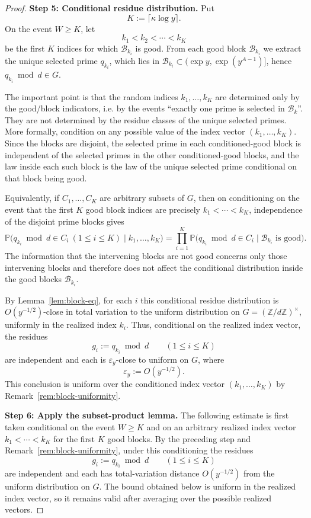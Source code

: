 \documentclass[11pt,reqno]{amsart}
\theoremstyle{plain}
\theoremstyle{definition}
\newcommand{\ZZ}{\mathbb{Z}}
\newcommand{\PP}{\mathbb{P}}
\newcommand{\eps}{\varepsilon}
\begin{document}
\begin{proof}
\medskip\noindent
\textbf{Step 5: Conditional residue distribution.} Put
\[
K:=\lceil \kappa\log y\rceil.
\]
On the event $W\ge K$, let
\[
k_1<k_2<\cdots<k_K
\]
be the first $K$ indices for which $\mathcal B_{k_i}$ is good. From each good
block $\mathcal B_{k_i}$ we extract the unique selected prime $q_{k_i}$, which
lies in $\mathcal B_{k_i}\subset(\exp y,\exp(y^{A-1})]$, hence
$q_{k_i}\bmod d\in G$.

The important point is that the random indices $k_1,\dots,k_K$ are determined
only by the good/block indicators, i.e. by the events ``exactly one prime is
selected in $\mathcal B_k$''. They are not determined by the residue classes of
the unique selected primes. More formally, condition on any possible value of
the index vector $(k_1,\dots,k_K)$. Since the blocks are disjoint, the selected
prime in each conditioned-good block is independent of the selected primes in
the other conditioned-good blocks, and the law inside each such block is the
law of the unique selected prime conditional on that block being good.

Equivalently, if $C_1,\ldots,C_K$ are arbitrary subsets of $G$, then on
conditioning on the event that the first $K$ good block indices are precisely
$k_1<\cdots<k_K$, independence of the disjoint prime blocks gives
\[
 \PP\bigl(q_{k_i}\bmod d\in C_i\ (1\le i\le K)\mid k_1,\ldots,k_K\bigr)
 =
 \prod_{i=1}^K
 \PP\bigl(q_{k_i}\bmod d\in C_i\mid \mathcal B_{k_i}\text{ is good}\bigr).
\]
The information that the intervening blocks are not good concerns only those
intervening blocks and therefore does not affect the conditional distribution
inside the good blocks $\mathcal B_{k_i}$.

By Lemma~\ref{lem:block-eq}, for each $i$ this conditional residue distribution
is $O(y^{-1/2})$-close in total variation to the uniform distribution on
$G=(\ZZ/d\ZZ)^\times$, uniformly in the realized index $k_i$. Thus, conditional
on the realized index vector, the residues
\[
g_i:=q_{k_i}\bmod d\qquad (1\le i\le K)
\]
are independent and each is $\eps_y$-close to uniform on $G$, where
\[
\eps_y:=O(y^{-1/2}).
\]
This conclusion is uniform over the conditioned index vector
$(k_1,\dots,k_K)$ by Remark~\ref{rem:block-uniformity}.

\medskip\noindent
\textbf{Step 6: Apply the subset-product lemma.}
The following estimate is first taken conditional on the event $W\ge K$ and on
an arbitrary realized index vector $k_1<\cdots<k_K$ for the first $K$ good
blocks. By the preceding step and Remark~\ref{rem:block-uniformity}, under this
conditioning the residues
\[
   g_i:=q_{k_i}\bmod d \qquad (1\le i\le K)
\]
are independent and each has total-variation distance $O(y^{-1/2})$ from the
uniform distribution on $G$. The bound obtained below is uniform in the realized
index vector, so it remains valid after averaging over the possible realized
vectors.


\end{proof}
\end{document}
